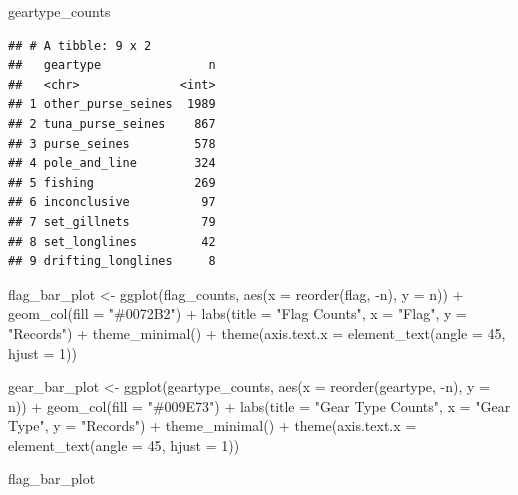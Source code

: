 \documentclass[
]{article}
\newenvironment{Shaded}{\begin{snugshade}}{\end{snugshade}}
\newcommand{\AttributeTok}[1]{\textcolor[rgb]{0.77,0.63,0.00}{#1}}
\newcommand{\DecValTok}[1]{\textcolor[rgb]{0.00,0.00,0.81}{#1}}
\newcommand{\FunctionTok}[1]{\textcolor[rgb]{0.00,0.00,0.00}{#1}}
\newcommand{\NormalTok}[1]{#1}
\newcommand{\OtherTok}[1]{\textcolor[rgb]{0.56,0.35,0.01}{#1}}
\newcommand{\SpecialCharTok}[1]{\textcolor[rgb]{0.00,0.00,0.00}{#1}}
\newcommand{\StringTok}[1]{\textcolor[rgb]{0.31,0.60,0.02}{#1}}
\begin{document}
\begin{Shaded}
\begin{Highlighting}[]
\NormalTok{geartype\_counts}
\end{Highlighting}
\end{Shaded}

\begin{verbatim}
## # A tibble: 9 x 2
##   geartype               n
##   <chr>              <int>
## 1 other_purse_seines  1989
## 2 tuna_purse_seines    867
## 3 purse_seines         578
## 4 pole_and_line        324
## 5 fishing              269
## 6 inconclusive          97
## 7 set_gillnets          79
## 8 set_longlines         42
## 9 drifting_longlines     8
\end{verbatim}

\begin{Shaded}
\begin{Highlighting}[]
\NormalTok{flag\_bar\_plot }\OtherTok{\textless{}{-}} \FunctionTok{ggplot}\NormalTok{(flag\_counts, }\FunctionTok{aes}\NormalTok{(}\AttributeTok{x =} \FunctionTok{reorder}\NormalTok{(flag, }\SpecialCharTok{{-}}\NormalTok{n), }\AttributeTok{y =}\NormalTok{ n)) }\SpecialCharTok{+}
  \FunctionTok{geom\_col}\NormalTok{(}\AttributeTok{fill =} \StringTok{"\#0072B2"}\NormalTok{) }\SpecialCharTok{+}
  \FunctionTok{labs}\NormalTok{(}\AttributeTok{title =} \StringTok{"Flag Counts"}\NormalTok{, }\AttributeTok{x =} \StringTok{"Flag"}\NormalTok{, }\AttributeTok{y =} \StringTok{"Records"}\NormalTok{) }\SpecialCharTok{+}
  \FunctionTok{theme\_minimal}\NormalTok{() }\SpecialCharTok{+}
  \FunctionTok{theme}\NormalTok{(}\AttributeTok{axis.text.x =} \FunctionTok{element\_text}\NormalTok{(}\AttributeTok{angle =} \DecValTok{45}\NormalTok{, }\AttributeTok{hjust =} \DecValTok{1}\NormalTok{))}

\NormalTok{gear\_bar\_plot }\OtherTok{\textless{}{-}} \FunctionTok{ggplot}\NormalTok{(geartype\_counts, }\FunctionTok{aes}\NormalTok{(}\AttributeTok{x =} \FunctionTok{reorder}\NormalTok{(geartype, }\SpecialCharTok{{-}}\NormalTok{n), }\AttributeTok{y =}\NormalTok{ n)) }\SpecialCharTok{+}
  \FunctionTok{geom\_col}\NormalTok{(}\AttributeTok{fill =} \StringTok{"\#009E73"}\NormalTok{) }\SpecialCharTok{+}
  \FunctionTok{labs}\NormalTok{(}\AttributeTok{title =} \StringTok{"Gear Type Counts"}\NormalTok{, }\AttributeTok{x =} \StringTok{"Gear Type"}\NormalTok{, }\AttributeTok{y =} \StringTok{"Records"}\NormalTok{) }\SpecialCharTok{+}
  \FunctionTok{theme\_minimal}\NormalTok{() }\SpecialCharTok{+}
  \FunctionTok{theme}\NormalTok{(}\AttributeTok{axis.text.x =} \FunctionTok{element\_text}\NormalTok{(}\AttributeTok{angle =} \DecValTok{45}\NormalTok{, }\AttributeTok{hjust =} \DecValTok{1}\NormalTok{))}

\NormalTok{flag\_bar\_plot}
\end{Highlighting}
\end{Shaded}
\end{document}
